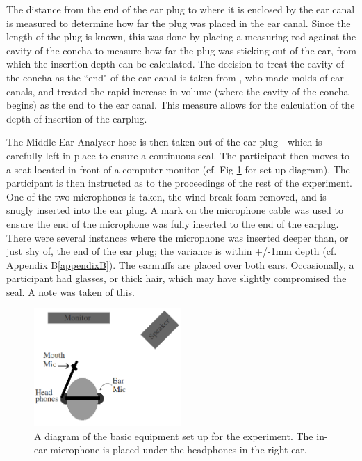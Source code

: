 \documentclass[dissertation,copyright]{uathesis}
\begin{document}
The distance from the end of the ear plug to where it is enclosed by the ear canal is measured to determine how far the plug was placed in the ear canal. %
Since the length of the plug is known, this was done by placing a measuring rod against the cavity of the concha to measure how far the plug was sticking out of the ear, from which the insertion depth can be calculated. The decision to treat the cavity of the concha as the ``end" of the ear canal is taken from \cite{stenfelt:07}, who made molds of ear canals, and treated the rapid increase in volume (where the cavity of the concha begins) as the end to the ear canal.  This measure allows for the calculation of the depth of insertion of the earplug.

The Middle Ear Analyser hose is then taken out of the ear plug - which is carefully left in place to ensure a continuous seal.  The participant then moves to a seat located in front of a computer monitor (cf. Fig \ref{fig:overallSetUp} for set-up diagram).  The participant is then instructed as to the proceedings of the rest of the experiment. One of the two microphones is taken, the wind-break foam removed, and is snugly inserted into the ear plug.  A mark on the microphone cable was used to ensure the end of the microphone was fully inserted to the end of the earplug.  There were several instances where the microphone was inserted deeper than, or just shy of, the end of the ear plug; the variance is within +/-1mm depth (cf. Appendix B\ref{appendixB}).  The earmuffs are placed over both ears.  Occasionally, a participant had glasses, or thick hair, which may have slightly compromised the seal.  A note was taken of this. 

\begin{figure}
\includegraphics[width=0.5\textwidth]{figure/overallSetUp.png}
\caption{A diagram of the basic equipment set up for the experiment.  The in-ear microphone is placed under the headphones in the right ear.}
\label{fig:overallSetUp}
\end{figure}
\end{document}
